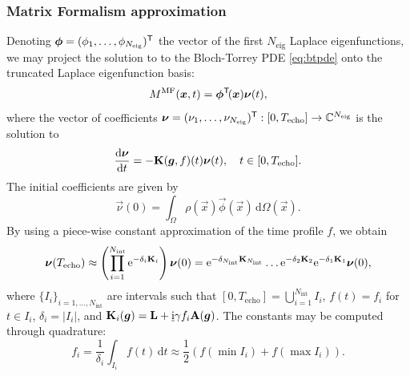 \documentclass[a4paper]{article}
\begin{document}
\subsubsection{Matrix Formalism approximation}

Denoting $\bm{\phi} = (\phi_1, \dots, \phi_{N_\text{eig}})^{\mathsf{T}}$ the vector of the first $N_\text{eig}$ Laplace eigenfunctions, we may project the solution to to the Bloch-Torrey PDE \eqref{eq:btpde} onto the truncated Laplace eigenfunction basis:
\begin{equation}
    M^\text{MF}(\bm{x}, t) = \bm{\phi}^{\mathsf{T}}\!(\bm{x}) \bm{\nu}(t),
\end{equation}
where the vector of coefficients $\bm{\nu} = (\nu_1, \dots, \nu_{N_\text{eig}})^{\mathsf{T}} : [0, T_\text{echo}] \to \mathbb{C}^{N_\text{eig}}$ is the solution to
\begin{equation}\label{eq:btpde_mf}
    \frac{\mathrm{d} \bm{\nu}}{\mathrm{d} t} = -\mathbf{K}(\bm{g}, f)(t) \bm{\nu}(t), \quad t\in [0, T_\text{echo}].
\end{equation}
The initial coefficients are given by
\begin{equation}
    \vec{\nu}(0) = \int_\Omega \rho(\vec{x}) \vec{\phi}(\vec{x}) \, \mathrm{d} \Omega(\vec{x}).
\end{equation}
By using a piece-wise constant approximation \cite{Barzykin1999} of the time profile $f$, we obtain
\begin{equation}\label{eq:mf_coefficients}
    \bm{\nu}(T_\text{echo}) \approx \left(\prod_{i = 1}^{N_\text{int}} \mathrm{e}^{-\delta_i \mathbf{K}_i}\right) \bm{\nu}(0) = \mathrm{e}^{-\delta_{N_\text{int}} \mathbf{K}_{N_\text{int}}} \dots \mathrm{e}^{-\delta_2 \mathbf{K}_2} \mathrm{e}^{-\delta_1 \mathbf{K}_1} \bm{\nu}(0),
\end{equation}
where $\{I_i\}_{i = 1, \dots, N_\text{int}}$ are intervals such that $[0, T_\text{echo}] = \bigcup_{i = 1}^{N_\text{int}} I_i$, $f(t) = f_i$ for $t \in I_i$, $\delta_i = |I_i|$, and $\mathbf{K}_i(\bm{g}) = \mathbf{L} + \underline{\mathrm{i}} \gamma f_i \mathbf{A}(\bm{g})$. The constants may be computed through quadrature:
\begin{equation}
    f_i = \frac{1}{\delta_i}\int_{I_i} f(t) \, \mathrm{d} t \approx \frac{1}{2} \left(f(\min I_i) + f(\max I_i)\right).
\end{equation}
\end{document}
